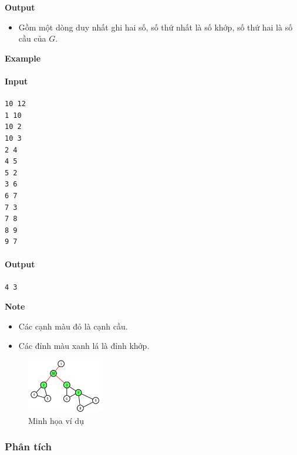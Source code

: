 \documentclass{article}
\begin{document}
\textbf{Output}
\begin{itemize}
    \item Gồm một dòng duy nhất ghi hai số, số thứ nhất là số khớp, số thứ hai là số cầu của $G$.
\end{itemize}

\textbf{Example}

\paragraph{Input}
\begin{lstlisting}
10 12
1 10
10 2
10 3
2 4
4 5
5 2
3 6
6 7
7 3
7 8
8 9
9 7
\end{lstlisting}
\paragraph{Output}
\begin{lstlisting}
4 3 
\end{lstlisting}

\textbf{Note}
\begin{itemize}
    \item Các cạnh màu đỏ là cạnh cầu.
    \item Các đỉnh màu xanh lá là đỉnh khớp.
\end{itemize}

\begin{figure}[h]
    \centering
    \includegraphics[width=0.3\textwidth]{img/b4/Depth-First-Search-Tree_img5.png}
    \caption{Minh họa ví dụ}
\end{figure}

\subsubsection*{Phân tích}
\end{document}
